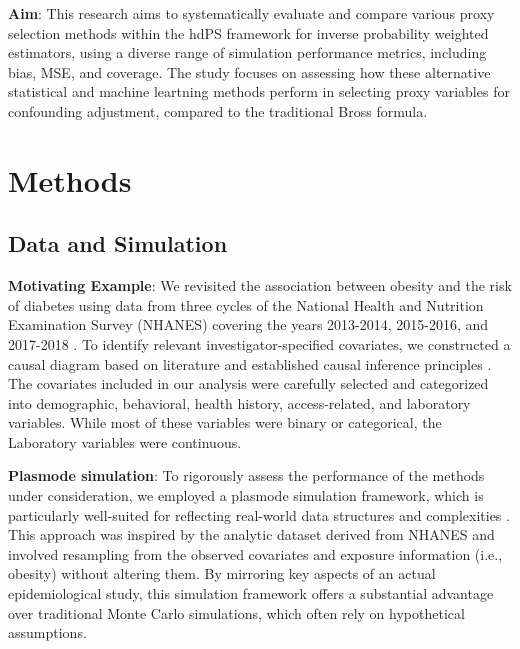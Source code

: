 \documentclass[sn-vancouver,Numbered,lineno,pdflatex]{sn-jnl}
\begin{document}
\textbf{Aim}: This research aims to systematically evaluate and compare
various proxy selection methods within the hdPS framework for inverse
probability weighted estimators, using a diverse range of simulation
performance metrics, including bias, MSE, and coverage. The study
focuses on assessing how these alternative statistical and machine
leartning methods perform in selecting proxy variables for confounding
adjustment, compared to the traditional Bross formula.

\section{Methods}\label{methods}

\subsection*{Data and Simulation}\label{data-and-simulation}

\textbf{Motivating Example}: We revisited the association between
obesity and the risk of diabetes using data from three cycles of the
National Health and Nutrition Examination Survey (NHANES) covering the
years 2013-2014, 2015-2016, and 2017-2018 \citep{karim2024high}. To
identify relevant investigator-specified covariates, we constructed a
causal diagram based on literature
\citep{saydah2014trends, liu2013association, kabadi2012joint, ostchega2012abdominal}
and established causal inference principles \citep{greenland1999causal}.
The covariates included in our analysis were carefully selected and
categorized into demographic, behavioral, health history,
access-related, and laboratory variables. While most of these variables
were binary or categorical, the Laboratory variables were continuous.

\textbf{Plasmode simulation}: To rigorously assess the performance of
the methods under consideration, we employed a plasmode simulation
framework, which is particularly well-suited for reflecting real-world
data structures and complexities \citep{franklin2014plasmode}. This
approach was inspired by the analytic dataset derived from NHANES and
involved resampling from the observed covariates and exposure
information (i.e., obesity) without altering them. By mirroring key
aspects of an actual epidemiological study, this simulation framework
offers a substantial advantage over traditional Monte Carlo simulations,
which often rely on hypothetical assumptions.
\end{document}
